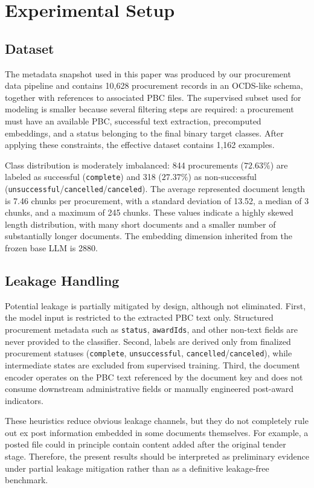 \documentclass[conference]{IEEEtran}
\begin{document}
\section{Experimental Setup}
\subsection{Dataset}
The metadata snapshot used in this paper was produced by our procurement data pipeline and contains 10{,}628 procurement records in an OCDS-like schema, together with references to associated PBC files. The supervised subset used for modeling is smaller because several filtering steps are required: a procurement must have an available PBC, successful text extraction, precomputed embeddings, and a status belonging to the final binary target classes. After applying these constraints, the effective dataset contains 1{,}162 examples.

Class distribution is moderately imbalanced: 844 procurements ($72.63\%$) are labeled as successful (\texttt{complete}) and 318 ($27.37\%$) as non-successful (\texttt{unsuccessful}/\texttt{cancelled}/\texttt{canceled}). The average represented document length is 7.46 chunks per procurement, with a standard deviation of 13.52, a median of 3 chunks, and a maximum of 245 chunks. These values indicate a highly skewed length distribution, with many short documents and a smaller number of substantially longer documents. The embedding dimension inherited from the frozen base LLM is 2880.

\subsection{Leakage Handling}
Potential leakage is partially mitigated by design, although not eliminated. First, the model input is restricted to the extracted PBC text only. Structured procurement metadata such as \texttt{status}, \texttt{awardIds}, and other non-text fields are never provided to the classifier. Second, labels are derived only from finalized procurement statuses (\texttt{complete}, \texttt{unsuccessful}, \texttt{cancelled}/\texttt{canceled}), while intermediate states are excluded from supervised training. Third, the document encoder operates on the PBC text referenced by the document key and does not consume downstream administrative fields or manually engineered post-award indicators.

These heuristics reduce obvious leakage channels, but they do not completely rule out ex post information embedded in some documents themselves. For example, a posted file could in principle contain content added after the original tender stage. Therefore, the present results should be interpreted as preliminary evidence under partial leakage mitigation rather than as a definitive leakage-free benchmark.
\end{document}
